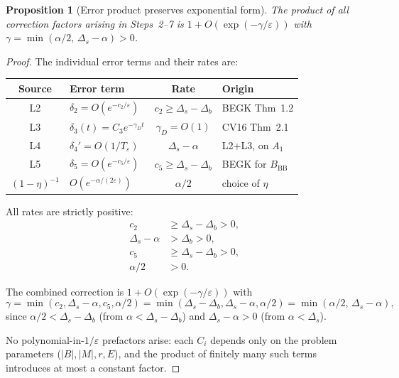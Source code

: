 \documentclass[11pt]{article}
\newtheorem{proposition}[theorem]{Proposition}
\newcommand{\eps}{\varepsilon}
\newcommand{\Ds}{\Delta_s}
\newcommand{\Db}{\Delta_b}
\newcommand{\BBB}{B_{\mathrm{BB}}}
\newcommand{\Teps}{T_\eps}
\begin{document}
\begin{proposition}[Error product preserves exponential form]
\label{prop:error-composition}
The product of all correction factors arising in Steps~2--7 is
$1 + O(\exp(-\gamma/\eps))$ with
$\gamma = \min(\alpha/2,\, \Ds - \alpha) > 0$.
\end{proposition}

\begin{proof}
The individual error terms and their rates are:

\medskip
\begin{center}
\renewcommand{\arraystretch}{1.3}
\begin{tabular}{|c|l|c|l|}
\hline
\textbf{Source} & \textbf{Error term} & \textbf{Rate}
  & \textbf{Origin} \\
\hline\hline
L2 & $\delta_2 = O(e^{-c_2/\eps})$
  & $c_2 \geq \Ds - \Db$
  & BEGK Thm~1.2 \\
L3 & $\delta_3(t) = C_3 e^{-\gamma_D t}$
  & $\gamma_D = O(1)$
  & CV16 Thm~2.1 \\
L4 & $\delta_4' = O(1/\Teps)$
  & $\Ds - \alpha$
  & L2$+$L3, on $A_1$ \\
L5 & $\delta_5 = O(e^{-c_5/\eps})$
  & $c_5 \geq \Ds - \Db$
  & BEGK for $\BBB$ \\
$(1-\eta)^{-1}$ & $O(e^{-\alpha/(2\eps)})$
  & $\alpha/2$
  & choice of $\eta$ \\
\hline
\end{tabular}
\end{center}

\medskip\noindent
All rates are strictly positive:
\begin{align*}
  c_2 &\geq \Ds - \Db > 0, \\
  \Ds - \alpha &> \Db > 0, \\
  c_5 &\geq \Ds - \Db > 0, \\
  \alpha/2 &> 0.
\end{align*}

The combined correction is
$1 + O(\exp(-\gamma/\eps))$ with
\[
  \gamma = \min(c_2, \Ds - \alpha, c_5, \alpha/2)
  = \min(\Ds - \Db, \Ds - \alpha, \alpha/2)
  = \min(\alpha/2,\, \Ds - \alpha),
\]
since $\alpha/2 < \Ds - \Db$ (from $\alpha < \Ds - \Db$) and
$\Ds - \alpha > 0$ (from $\alpha < \Ds$).

No polynomial-in-$1/\eps$ prefactors arise: each $C_i$ depends
only on the problem parameters ($|B|, |M|, r, E$), and the product
of finitely many such terms introduces at most a constant factor.
\end{proof}
\end{document}
